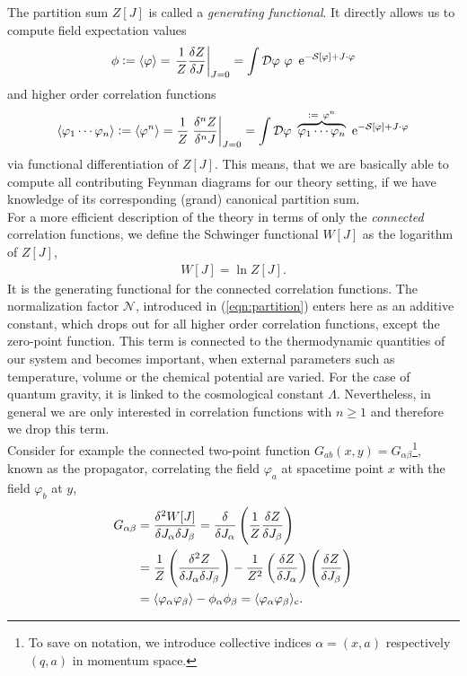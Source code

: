 The partition sum $Z[J]$ is called a \textit{generating functional}. It directly allows us to compute field expectation values
\begin{align}
	\phi := \cf{\varphi} = \eval{\frac{1}{Z}\frac{\delta Z}{\delta J}}_{J=0} = \int \D\varphi \ \varphi \ \operatorname{e}^{-\S + J\cdot\varphi}
\end{align}
and higher order correlation functions
\begin{align}
\cf{\varphi_1 \cdots \varphi_n} := \cf{\varphi^n} = \frac{1}{Z}\eval{\frac{\delta^n Z}{\delta^n J}}_{J=0} = \int \D\varphi \ \overbrace{\varphi_1 \cdots \varphi_n}^{:= \ \varphi^n} \ \operatorname{e}^{-\S + J\cdot\varphi}
\end{align}
via functional differentiation of $Z[J]$. This means, that we are basically able to compute all contributing Feynman diagrams for our theory setting, if we have knowledge of its corresponding (grand) canonical partition sum. \\
 For a more efficient description of the theory in terms of only the \textit{connected} correlation functions, we define the Schwinger functional $W[J]$ as the logarithm of $Z[J]$,  
\begin{align}
W[J] = \ln Z[J].
\label{eqn:Schwinger}
\end{align}
It is the generating functional for the connected correlation functions. The normalization factor $\mathcal{N}$, introduced in (\ref{eqn:partition}) enters here as an additive constant, which drops out for all higher order correlation functions, except the zero-point function. This term is connected to the thermodynamic quantities of our system and becomes important, when external parameters such as temperature, volume or the chemical potential are varied. For the case of quantum gravity, it is linked to the cosmological constant $\Lambda$. Nevertheless, in general we are only interested in correlation functions with $n\geq 1$ and therefore we drop this term.\\
Consider for example the connected two-point function $G_{ab}(x,y) = G_{\alpha\beta}$\footnote{To save on notation, we introduce collective indices $\alpha = (x,a)$ respectively $(q,a)$ in momentum space.}, known as the propagator, correlating the field $\varphi_a$ at spacetime point $x$ with the field $\varphi_b$ at $y$,
\begin{align}
	G_{\alpha\beta} &= \frac{\delta^2W[J]}{\delta J_{\alpha}\delta J_{\beta}} = \frac{\delta}{\delta J_{\alpha}}\left(\frac{1}{Z}\frac{\delta Z}{\delta J_{\beta}}\right) \nonumber \\
				&= \frac{1}{Z}\left(\frac{\delta^2Z}{\delta J_{\alpha}\delta J_{\beta}}\right) - \frac{1}{Z^2}\left(\frac{\delta Z}{\delta J_{\alpha}}\right)\left(\frac{\delta Z}{\delta J_{\beta}}\right)\\
				&= \langle \varphi_{\alpha}\varphi_{\beta} \rangle - \phi_{\alpha}\phi_{\beta} = \langle \varphi_{\alpha}\varphi_{\beta} \rangle_{\text{c}}.	\nonumber	
\end{align}
